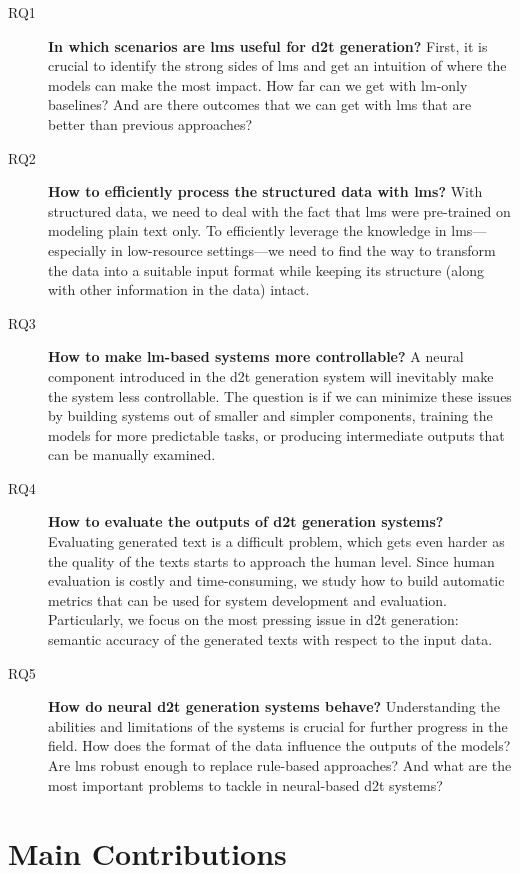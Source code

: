 \begin{description}
  \item[RQ1\label{rq:1}] \textbf{In which scenarios are \acp{lm} useful for \ac{d2t} generation?} First, it is crucial to identify the strong sides of \acp{lm} and get an intuition of where the models can make the most impact. How far can we get with \ac{lm}-only baselines? And are there outcomes that we can get with \acp{lm} that are better than previous approaches?
  \item[RQ2\label{rq:2}] \textbf{How to efficiently process the structured data with \acp{lm}?} With structured data, we need to deal with the fact that \acp{lm} were pre-trained on modeling plain text only. To efficiently leverage the knowledge in \acp{lm}---especially in low-resource settings---we need to find the way to transform the data into a suitable input format while keeping its structure (along with other information in the data) intact.
  \item[RQ3\label{rq:3}] \textbf{How to make \ac{lm}-based systems more controllable?} A neural component introduced in the \ac{d2t} generation system will inevitably make the system less controllable. The question is if we can minimize these issues by building systems out of smaller and simpler components, training the models for more predictable tasks, or producing intermediate outputs that can be manually examined.
  \item[RQ4\label{rq:4}] \textbf{How to evaluate the outputs of \ac{d2t} generation systems?} Evaluating generated text is a difficult problem, which gets even harder as the quality of the texts starts to approach the human level. Since human evaluation is costly and time-consuming, we study how to build automatic metrics that can be used for system development and evaluation. Particularly, we focus on the most pressing issue in \ac{d2t} generation: semantic accuracy of the generated texts with respect to the input data.
  \item[RQ5\label{rq:5}] \textbf{How do neural \ac{d2t} generation systems behave?} Understanding the abilities and limitations of the systems is crucial for further progress in the field. How does the format of the data influence the outputs of the models? Are \acp{lm} robust enough to replace rule-based approaches? And what are the most important problems to tackle in neural-based \ac{d2t} systems?
\end{description}



\section{Main Contributions}
\label{sec:contributions}


